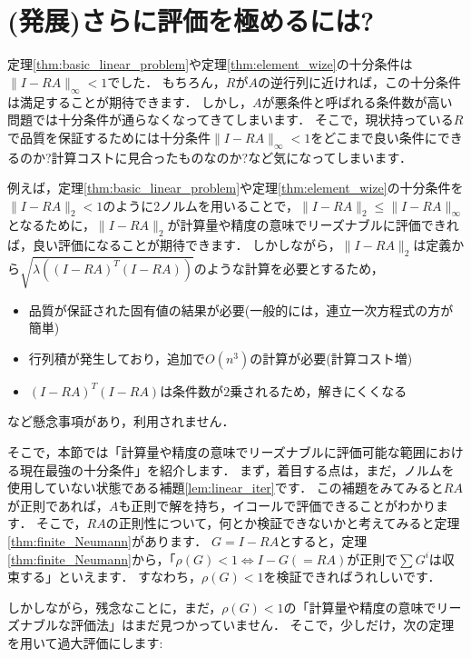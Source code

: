 \section{(発展)さらに評価を極めるには?}\label{sec:optional_linear_program}
定理\ref{thm:basic_linear_problem}や定理\ref{thm:element_wize}の十分条件は$\| I - RA \|_{\infty} < 1$でした．
もちろん，$R$が$A$の逆行列に近ければ，この十分条件は満足することが期待できます．
しかし，$A$が悪条件と呼ばれる条件数が高い問題では十分条件が通らなくなってきてしまいます．
そこで，現状持っている$R$で品質を保証するためには十分条件$\| I - RA \|_{\infty} < 1$をどこまで良い条件にできるのか?計算コストに見合ったものなのか?など気になってしまいます．

例えば，定理\ref{thm:basic_linear_problem}や定理\ref{thm:element_wize}の十分条件を$\| I - RA \|_{2} < 1$のように$2$ノルムを用いることで，$\| I - RA \|_{2} \le \| I - RA \|_{\infty}$となるために，$\| I - RA \|_{2}$が計算量や精度の意味でリーズナブルに評価できれば，良い評価になることが期待できます．
しかしながら，$\| I - RA \|_{2}$は定義から$\sqrt{ \lambda( (I - RA)^T (I - RA) ) }$のような計算を必要とするため，
\begin{itemize}
	\item 品質が保証された固有値の結果が必要(一般的には，連立一次方程式の方が簡単)
	\item 行列積が発生しており，追加で$O(n^3)$の計算が必要(計算コスト増)
	\item $(I - RA)^T (I - RA)$は条件数が$2$乗されるため，解きにくくなる
\end{itemize}
など懸念事項があり，利用されません．

そこで，本節では「計算量や精度の意味でリーズナブルに評価可能な範囲における現在最強の十分条件」を紹介します．
まず，着目する点は，まだ，ノルムを使用していない状態である補題\ref{lem:linear_iter}です．
この補題をみてみると$RA$が正則であれば，$A$も正則で解を持ち，イコールで評価できることがわかります．
そこで，$RA$の正則性について，何とか検証できないかと考えてみると定理\ref{thm:finite_Neumann}があります．
$G = I - RA$とすると，定理\ref{thm:finite_Neumann}から，「$\rho(G) < 1 \Leftrightarrow I - G (= RA)$が正則で$\sum G^i$は収束する」といえます．
すなわち，$\rho(G) < 1$を検証できればうれしいです．

しかしながら，残念なことに，まだ，$\rho(G) < 1$の「計算量や精度の意味でリーズナブルな評価法」はまだ見つかっていません．
そこで，少しだけ，次の定理を用いて過大評価にします:

